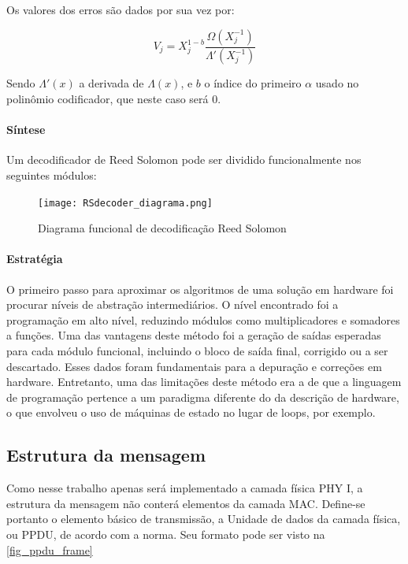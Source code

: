 	Os valores dos erros são dados por sua vez por:
	
	\begin{equation}
	V_{j} = X_{j}^{1-b} \frac{\Omega(X_{j}^{-1})}{\Lambda'(X_{j}^{-1})}
	\end{equation}
	
	Sendo $\Lambda'(x)$ a derivada de $\Lambda(x)$, e $b$ o índice do primeiro $\alpha$ usado no polinômio codificador, que neste caso será 0.
	
	\paragraph{Síntese}
	
	Um decodificador de Reed Solomon pode ser dividido funcionalmente nos seguintes módulos:

	\begin{figure}[htb]
		\caption{\label{RSDecoder_diagrama_logico} Diagrama funcional de decodificação Reed Solomon}
		\centering
		\texttt{[image: RSdecoder\_diagrama.png]}
	\end{figure}
	
	\paragraph{Estratégia}
	
	O primeiro passo para aproximar os algoritmos de uma solução em hardware foi procurar níveis de abstração intermediários. O nível encontrado foi a programação em alto nível, reduzindo módulos como multiplicadores e somadores a funções. Uma das vantagens deste método foi a geração de saídas esperadas para cada módulo funcional, incluindo o bloco de saída final, corrigido ou a ser descartado. Esses dados foram fundamentais para a depuração e correções em hardware. Entretanto, uma das limitações deste método era a de que a linguagem de programação pertence a um paradigma diferente do da descrição de hardware, o que envolveu o uso de máquinas de estado no lugar de loops, por exemplo.  
	
	\subsection{Estrutura da mensagem}
	
	Como nesse trabalho apenas será implementado a camada física PHY I, a estrutura da mensagem não conterá elementos da camada MAC. Define-se portanto o elemento básico de transmissão, a Unidade de dados da camada física, ou PPDU, de acordo com a norma. Seu formato pode ser visto na \autoref{fig_ppdu_frame}
	
